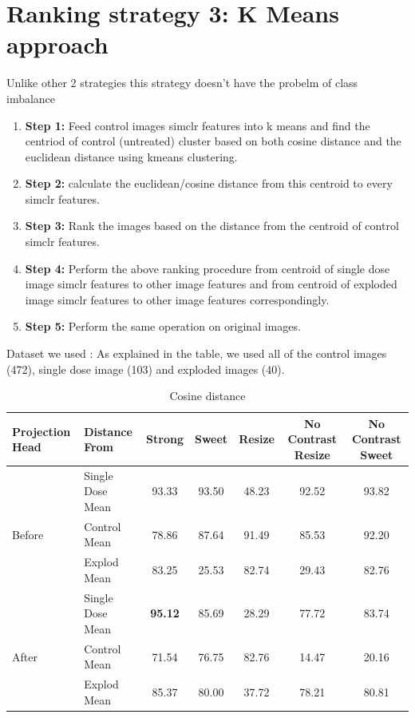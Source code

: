 \section{Ranking strategy 3: K Means approach}

Unlike other 2 strategies this strategy doesn't have the probelm of class imbalance

\begin{enumerate}
  \item \textbf{Step 1:} Feed control images simclr features into k means and find the centriod of control (untreated) cluster based on both cosine distance and the euclidean distance using kmeans clustering. 
 
  
  \item \textbf{Step 2:} calculate the euclidean/cosine distance from this centroid to every simclr features.
  \item \textbf{Step 3:} Rank the images based on the distance from the centroid of control simclr features.
  \item \textbf{Step 4:} Perform the above ranking procedure from centroid of single dose image simclr features to other image features and from centroid of exploded image simclr features to other image features correspondingly.
  
  \item \textbf{Step 5:} Perform the same operation  on original images.
\end{enumerate}


Dataset we used : As explained in the table, we used all of the control images (472),
single dose image (103) and exploded images (40).

\begin{table}[H]
  \centering
  \begin{tabular}{@{}llccccc@{}}
  \toprule
  Projection Head & Distance From      & Strong & Sweet & Resize & No Contrast Resize & No Contrast Sweet \\ \midrule
                  & Single Dose Mean   & 93.33      & 93.50     & 48.23      & 92.52                  & 93.82                 \\
  Before          & Control Mean       & 78.86      & 87.64     & 91.49      & 85.53                  & 92.20                 \\
                  & Explod Mean        & 83.25      & 25.53     & 82.74      & 29.43                  & 82.76                 \\ \midrule
                  & Single Dose Mean   & \textbf{95.12}      & 85.69     & 28.29      & 77.72                  & 83.74                 \\
  After           & Control Mean       & 71.54      & 76.75     & 82.76      & 14.47                  & 20.16                 \\
                  & Explod Mean        & 85.37      & 80.00     & 37.72      & 78.21                  & 80.81                 \\ \bottomrule
  \end{tabular}
  \caption{Cosine distance}
  \label{tab:table_label}
\end{table}

